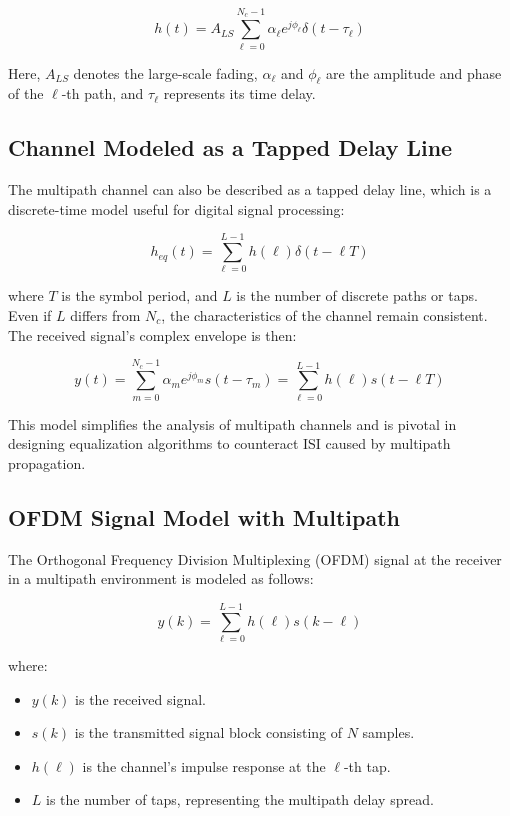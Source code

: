 \begin{equation}
    h(t) = A_{LS} \sum_{\ell=0}^{N_c-1} \alpha_{\ell} e^{j\phi_{\ell}} \delta(t - \tau_{\ell})
\end{equation}

Here, \( A_{LS} \) denotes the large-scale fading, \( \alpha_{\ell} \) and \( \phi_{\ell} \) are the amplitude and phase of the \(\ell\)-th path, and \( \tau_{\ell} \) represents its time delay.

\subsection*{Channel Modeled as a Tapped Delay Line}

The multipath channel can also be described as a tapped delay line, which is a discrete-time model useful for digital signal processing:

\begin{equation}
    h_{eq}(t) = \sum_{\ell=0}^{L-1} h(\ell) \delta(t - \ell T)
\end{equation}

where \( T \) is the symbol period, and \( L \) is the number of discrete paths or taps. Even if \( L \) differs from \( N_c \), the characteristics of the channel remain consistent. The received signal's complex envelope is then:

\begin{equation}
    y(t) = \sum_{m=0}^{N_c-1} \alpha_m e^{j\phi_m} s(t - \tau_m) = \sum_{\ell=0}^{L-1} h(\ell) s(t - \ell T)
\end{equation}

This model simplifies the analysis of multipath channels and is pivotal in designing equalization algorithms to counteract ISI caused by multipath propagation.

\subsection*{OFDM Signal Model with Multipath}

The Orthogonal Frequency Division Multiplexing (OFDM) signal at the receiver in a multipath environment is modeled as follows:

\begin{equation}
    y(k) = \sum_{\ell=0}^{L-1} h(\ell) s(k - \ell)
\end{equation}

where:
\begin{itemize}
    \item \(y(k)\) is the received signal.
    \item \(s(k)\) is the transmitted signal block consisting of \(N\) samples.
    \item \(h(\ell)\) is the channel's impulse response at the \(\ell\)-th tap.
    \item \(L\) is the number of taps, representing the multipath delay spread.
\end{itemize}

